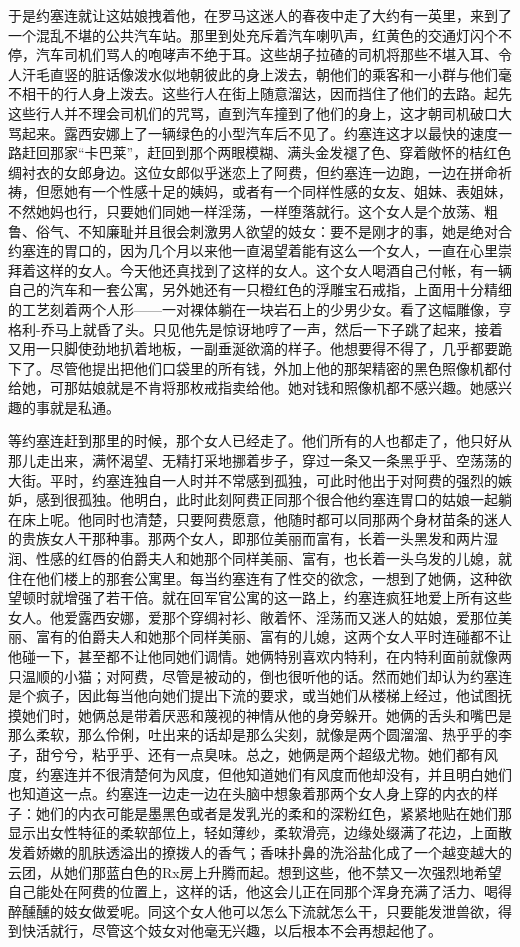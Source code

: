     于是约塞连就让这姑娘拽着他，在罗马这迷人的春夜中走了大约有一英里，来到了一个混乱不堪的公共汽车站。那里到处充斥着汽车喇叭声，红黄色的交通灯闪个不停，汽车司机们骂人的咆哮声不绝于耳。这些胡子拉碴的司机将那些不堪入耳、令人汗毛直竖的脏话像泼水似地朝彼此的身上泼去，朝他们的乘客和一小群与他们毫不相干的行人身上泼去。这些行人在街上随意溜达，因而挡住了他们的去路。起先这些行人并不理会司机们的咒骂，直到汽车撞到了他们的身上，这才朝司机破口大骂起来。露西安娜上了一辆绿色的小型汽车后不见了。约塞连这才以最快的速度一路赶回那家“卡巴莱”，赶回到那个两眼模糊、满头金发褪了色、穿着敞怀的桔红色绸衬衣的女郎身边。这位女郎似乎迷恋上了阿费，但约塞连一边跑，一边在拼命祈祷，但愿她有一个性感十足的姨妈，或者有一个同样性感的女友、姐妹、表姐妹，不然她妈也行，只要她们同她一样淫荡，一样堕落就行。这个女人是个放荡、粗鲁、俗气、不知廉耻并且很会刺激男人欲望的妓女：要不是刚才的事，她是绝对合约塞连的胃口的，因为几个月以来他一直渴望着能有这么一个女人，一直在心里崇拜着这样的女人。今天他还真找到了这样的女人。这个女人喝酒自己付帐，有一辆自己的汽车和一套公寓，另外她还有一只橙红色的浮雕宝石戒指，上面用十分精细的工艺刻着两个人形——一对裸体躺在一块岩石上的少男少女。看了这幅雕像，亨格利-乔马上就昏了头。只见他先是惊讶地哼了一声，然后一下子跳了起来，接着又用一只脚使劲地扒着地板，一副垂涎欲滴的样子。他想要得不得了，几乎都要跪下了。尽管他提出把他们口袋里的所有钱，外加上他的那架精密的黑色照像机都付给她，可那姑娘就是不肯将那枚戒指卖给他。她对钱和照像机都不感兴趣。她感兴趣的事就是私通。

    等约塞连赶到那里的时候，那个女人已经走了。他们所有的人也都走了，他只好从那儿走出来，满怀渴望、无精打采地挪着步子，穿过一条又一条黑乎乎、空荡荡的大街。平时，约塞连独自一人时并不常感到孤独，可此时他出于对阿费的强烈的嫉妒，感到很孤独。他明白，此时此刻阿费正同那个很合他约塞连胃口的姑娘一起躺在床上呢。他同时也清楚，只要阿费愿意，他随时都可以同那两个身材苗条的迷人的贵族女人干那种事。那两个女人，即那位美丽而富有，长着一头黑发和两片湿润、性感的红唇的伯爵夫人和她那个同样美丽、富有，也长着一头乌发的儿媳，就住在他们楼上的那套公寓里。每当约塞连有了性交的欲念，一想到了她俩，这种欲望顿时就增强了若干倍。就在回军官公寓的这一路上，约塞连疯狂地爱上所有这些女人。他爱露西安娜，爱那个穿绸衬衫、敞着怀、淫荡而又迷人的姑娘，爱那位美丽、富有的伯爵夫人和她那个同样美丽、富有的儿媳，这两个女人平时连碰都不让他碰一下，甚至都不让他同她们调情。她俩特别喜欢内特利，在内特利面前就像两只温顺的小猫；对阿费，尽管是被动的，倒也很听他的话。然而她们却认为约塞连是个疯子，因此每当他向她们提出下流的要求，或当她们从楼梯上经过，他试图抚摸她们时，她俩总是带着厌恶和蔑视的神情从他的身旁躲开。她俩的舌头和嘴巴是那么柔软，那么伶俐，吐出来的话却是那么尖刻，就像是两个圆溜溜、热乎乎的李子，甜兮兮，粘乎乎、还有一点臭味。总之，她俩是两个超级尤物。她们都有风度，约塞连并不很清楚何为风度，但他知道她们有风度而他却没有，并且明白她们也知道这一点。约塞连一边走一边在头脑中想象着那两个女人身上穿的内衣的样子：她们的内衣可能是墨黑色或者是发乳光的柔和的深粉红色，紧紧地贴在她们那显示出女性特征的柔软部位上，轻如薄纱，柔软滑亮，边缘处缀满了花边，上面散发着娇嫩的肌肤透溢出的撩拨人的香气；香味扑鼻的洗浴盐化成了一个越变越大的云团，从她们那蓝白色的Rx房上升腾而起。想到这些，他不禁又一次强烈地希望自己能处在阿费的位置上，这样的话，他这会儿正在同那个浑身充满了活力、喝得醉醺醺的妓女做爱呢。同这个女人他可以怎么下流就怎么干，只要能发泄兽欲，得到快活就行，尽管这个妓女对他毫无兴趣，以后根本不会再想起他了。

